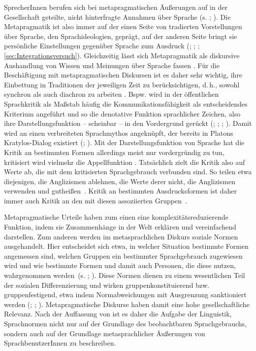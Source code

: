 SprecherInnen berufen sich bei metapragmatischen {\"A}u{\ss}erungen auf in der Gesellschaft geteilte, nicht hinterfragte Annahmen über Sprache (s. \citealp[1]{Gunthner.2012}; \citealp[205]{Konig2015}). 
Die Metapragmatik ist also immer auf der einen Seite von tradierten Vorstellungen über Sprache, den Sprachideologien, geprägt, auf der anderen Seite bringt sie persönliche Einstellungen gegenüber Sprache zum Ausdruck (\citealp[s.][196--197]{Silverstein2003}; \citealp[1319]{Vandermeeren2005}; \citealp{Spitzmuller2013}; \autoref{sec:Integrationsversuch}). 
Gleichzeitig lässt sich Metapragmatik als diskursive Aushandlung von Wissen und Meinungen über Sprache fassen \citep[s.][263]{Spitzmuller2013}. 
Für die Beschäftigung mit metapragmatischen Diskursen ist es daher sehr wichtig, ihre Einbettung in Traditionen der jeweiligen Zeit zu berücksichtigen, d.\,h., sowohl synchron als auch diachron zu arbeiten \citep[s.][325]{Spitzmuller2014}. 
Bspw. wird in der {\"o}ffentlichen Sprachkritik als Ma{\ss}stab h{\"a}ufig die Kommunikationsf{\"a}higkeit als entscheidendes Kriterium angef{\"u}hrt und so die denotative Funktion sprachlicher Zeichen, also ihre Darstellungsfunktion -- scheinbar -- in den Vordergrund ger{\"u}ckt (\citealp[s.][]{Buhler.1999}; \citealp[190]{Spitzmuller.2007}; \citealp[322]{Langer.}; \citealp[128]{Silverstein.2014}). 
Damit wird an einen verbreiteten Sprachmythos angeknüpft, der bereits in Platons Kratylos-Dialog existiert (\citealp[s.][57]{Heringer.2015}; \citealp[116]{Gal.2016}). 
Mit der Darstellungsfunktion von Sprache hat die Kritik an bestimmten Formen allerdings meist nur vordergr{\"u}ndig zu tun, kritisiert wird vielmehr die Appellfunktion \citep[s.][]{Buhler.1999}. 
Tatsächlich zielt die Kritik also auf Werte ab, die mit dem kritisierten Sprachgebrauch verbunden sind. 
So teilen etwa diejenigen, die Anglizismen ablehnen, die Werte derer nicht, die Anglizismen verwenden und guthei{\ss}en~\citep[s.][191]{Spitzmuller.2007}.
Kritik an bestimmten Ausdrucksformen ist daher immer auch Kritik an den mit diesen assoziierten Gruppen~\citep[s.][191]{Spitzmuller.2007}. 

Metapragmatische Urteile haben zum einen eine komplexit{\"a}tsreduzierende Funktion, indem sie Zusammenh{\"a}nge in der Welt erkl{\"a}ren und vereinfachend darstellen. 
Zum anderen werden im metasprachlichen Diskurs soziale Normen ausgehandelt. 
Hier entscheidet sich etwa, in welcher Situation bestimmte Formen angemessen sind, welchen Gruppen ein bestimmter Sprachgebrauch zugewiesen wird und wie bestimmte Formen und damit auch Personen, die diese nutzen, wahrgenommen werden~(s. \citealp[17]{Agha2007}; \citealp[200]{Konig2015}). 
Diese Normen dienen zu einem wesentlichen Teil der sozialen Differenzierung und wirken gruppenkonstituierend bzw. gruppenfestigend, etwa indem Normabweichungen mit Ausgrenzung sanktioniert werden (\citealp[s.][3]{Garrett2003}; \citeyear[33]{Garrett.2012}; \citealp[114]{Gal.2016}).
Metapragmatische Diskurse haben damit eine hohe gesellschaftliche Relevanz.
Nach der Auffassung von \citet[103]{Arendt2015} ist es daher die Aufgabe der Linguistik, Sprachnormen nicht nur auf der Grundlage des beobachtbaren Sprachgebrauchs, sondern auch auf der Grundlage metasprachlicher {\"A}u{\ss}erungen von SprachbenutzerInnen zu beschreiben. 
